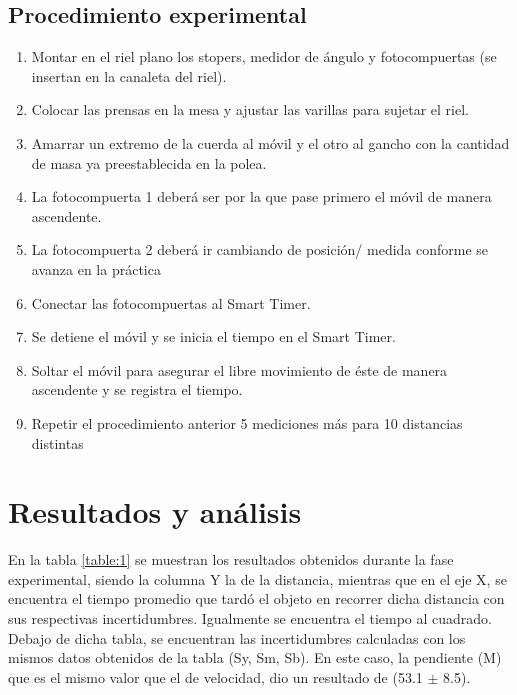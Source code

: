 \documentclass{article}
\begin{document}
\begin{multicols}{2}
\subsection{Procedimiento experimental}\label{Procedimiento experimental}
	\begin{enumerate}
		\item Montar en el riel plano los stopers, medidor de ángulo y fotocompuertas (se insertan
en la canaleta del riel).
		\item Colocar las prensas en la mesa y ajustar las varillas para sujetar el riel.
		\item Amarrar un extremo de la cuerda al móvil y el otro al gancho con la cantidad de
masa ya preestablecida en la polea. 
		\item La fotocompuerta 1 deberá ser por la que pase primero el móvil de manera
ascendente.
		\item La fotocompuerta 2 deberá ir cambiando de posición/ medida conforme se avanza
en la práctica 
		\item Conectar las fotocompuertas al Smart Timer.
		\item Se detiene el móvil y se inicia el tiempo en el Smart Timer. 
		\item Soltar el móvil para asegurar el libre movimiento de éste de manera ascendente y se
registra el tiempo.
		\item Repetir el procedimiento anterior 5 mediciones más para 10 distancias distintas 
	\end{enumerate}
\end{multicols}
\section{Resultados y análisis}\label{Resultados}			%
En la tabla \ref{table:1} se muestran los resultados obtenidos durante la fase experimental, siendo la columna Y la de la distancia, mientras que en el eje X, se encuentra el tiempo promedio que tardó el objeto en recorrer dicha distancia con sus respectivas incertidumbres. Igualmente se encuentra el tiempo al cuadrado. Debajo de dicha tabla, se encuentran las incertidumbres calculadas con los mismos datos obtenidos de la tabla (Sy, Sm, Sb). En este caso, la pendiente (M) que es el mismo valor que el de velocidad, dio un resultado de (53.1 $\pm$ 8.5). 
\end{document}
